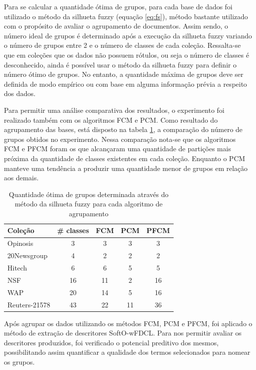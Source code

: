 Para se calcular a quantidade ótima de grupos, para cada base de dados foi utilizado o
método da silhueta fuzzy (equação \ref{eq:fs}), método bastante utilizado com o propósito de avaliar
o agrupamento de documentos. Assim sendo, o número ideal de grupos é determinado após a execução da
silhueta fuzzy variando o número de grupos entre 2 e o número de classes de cada coleção.
Ressalta-se que em coleções que os dados não possuem rótulos, ou seja o número de classes é
desconhecido, ainda é possível usar o método da silhueta fuzzy para definir o número ótimo de
grupos. No entanto, a quantidade máxima de grupos deve ser definida de modo empírico ou com base em
alguma informação prévia a respeito dos dados. 

Para permitir uma análise comparativa dos resultados, o experimento foi realizado também com os
algoritmos FCM e PCM.
Como resultado do agrupamento das bases, está disposto na tabela \ref{table:pfcmclusters}, a
comparação do número de grupos obtidos no experimento. Nessa comparação nota-se que os algoritmos
FCM e PFCM foram os que alcançaram uma quantidade de partições mais próxima da quantidade de classes
existentes em cada coleção. Enquanto o PCM manteve uma tendência a produzir uma quantidade menor de
grupos em relação aos demais.

\begin{table}[!htp]
  \centering
  \begin{tabular}{ |l|c|c|c|c|}
    \hline
    {\bf Coleção} & {\bf \# classes} & {\bf FCM} & {\bf PCM} & {\bf PFCM} \\
    \hline
    Opinosis & 3 & 3 & 3 & 3 \\
    \hline
    20Newsgroup & 4 & 2 & 2 & 2 \\
    \hline
    Hitech & 6 & 6 & 5 & 5 \\
    \hline
    NSF & 16 & 11 & 2 & 16 \\
    \hline
    WAP & 20 & 14 & 5 & 16 \\
    \hline
    Reuters-21578 & 43 & 22 & 11 & 36 \\
    \hline
  \end{tabular}
  \caption{Quantidade ótima de grupos determinada através do método da silhueta fuzzy para cada
  algoritmo de agrupamento}
  \label{table:pfcmclusters}
\end{table}

Após agrupar os dados utilizando os métodos FCM, PCM e PFCM, foi aplicado o método de extração 
de descritores SoftO-wFDCL. Para nos permitir avaliar os descritores produzidos, foi verificado o
potencial preditivo dos mesmos, possibilitando assim quantificar a qualidade dos
termos selecionados para nomear os grupos. 

